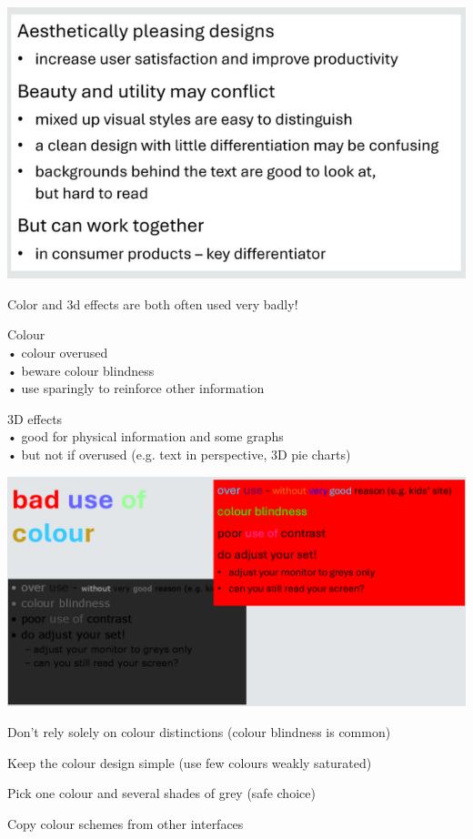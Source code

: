 \documentclass[]{project_plan}
\begin{document}
\includegraphics[width=\linewidth]{graphic_design_color_bg_good.png}

Color and 3d effects are both often used very badly!

Colour\\
• colour overused\\
• beware colour blindness\\
• use sparingly to reinforce other information

3D effects\\
• good for physical information and some graphs\\
• but not if overused (e.g. text in perspective, 3D pie charts)

\includegraphics[width=\linewidth]{graphic_design_bad_use_of_color.png}

Don't rely solely on colour distinctions (colour blindness is common)

Keep the colour design simple (use few colours weakly saturated)

Pick one colour and several shades of grey (safe choice)

Copy colour schemes from other interfaces
\end{document}
